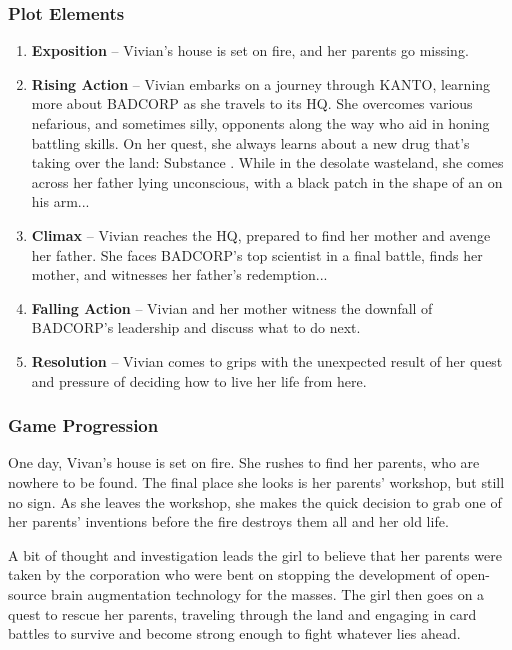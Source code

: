 \documentclass[12pt,titlepage]{article}
\newcommand\evilcorp{BADCORP\xspace}
\newcommand\world{KANTO\xspace}
\begin{document}
\subsubsection{Plot Elements}

\begin{enumerate}
    \item {\bf Exposition} -- Vivian's house is set on fire, and her parents go
    missing.
    \item {\bf Rising Action} -- Vivian embarks on a journey through \world,
    learning more about \evilcorp as she travels to its HQ. She overcomes
    various nefarious, and sometimes silly, opponents along the way who aid in
    honing battling skills. On her quest, she always learns about a new drug
    that's taking over the land: Substance \epsilon. While in the desolate
    wasteland, she comes across her father lying unconscious, with a black patch
    in the shape of an \epsilon on his arm...
    \item {\bf Climax} -- Vivian reaches the HQ, prepared to find her mother and
    avenge her father. She faces \evilcorp's top scientist in a final battle,
    finds her mother, and witnesses her father's redemption...
    \item {\bf Falling Action} -- Vivian and her mother witness the downfall of
    \evilcorp's leadership and discuss what to do next.
    \item {\bf Resolution} -- Vivian comes to grips with the unexpected
    result of her quest and pressure of deciding how to live her life from here.
\end{enumerate}

\subsubsection{Game Progression}

One day, Vivan's house is set on fire. She rushes to find her parents, who are
nowhere to be found. The final place she looks is her parents' workshop, but
still no sign. As she leaves the workshop, she makes the quick decision to grab
one of her parents' inventions before the fire destroys them all and her old
life.

A bit of thought and investigation leads the girl to believe that her parents
were taken by the corporation who were bent on stopping the development of
open-source brain augmentation technology for the masses. The girl then goes on
a quest to rescue her parents, traveling through the land and engaging in card
battles to survive and become strong enough to fight whatever lies ahead.
\end{document}
